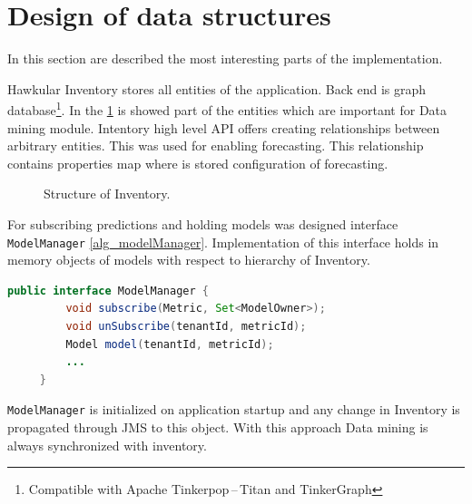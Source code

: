     \section{Design of data structures}
    In this section are described the most interesting parts of the implementation.
    
    Hawkular Inventory stores all entities of the application. Back end is graph
    database\footnote{Compatible with Apache Tinkerpop\,--\,Titan and TinkerGraph}.
    In the \ref{img_inventory} is showed part of the entities which are important for 
    Data mining module.
    Intentory high level API offers creating relationships between arbitrary entities. 
    This was used for enabling forecasting. This relationship contains properties map
    where is stored configuration of forecasting.

    \begin{figure}[H]
        \begin{center}
            \caption{Structure of Inventory.}
            \label{img_inventory}
        \end{center}
    \end{figure}

    For subscribing predictions and holding models was designed interface
    \texttt{ModelManager} \ref{alg_modelManager}. 
    Implementation of this interface holds in memory 
    objects of models with respect to hierarchy of Inventory.

    \begin{lstlisting}[caption={Interface Model Manager}, language=Java, label={alg_modelManager}]
     public interface ModelManager {
         void subscribe(Metric, Set<ModelOwner>);
         void unSubscribe(tenantId, metricId);
         Model model(tenantId, metricId);
         ...
     }
    \end{lstlisting}

    \texttt{ModelManager} is initialized on application startup and any change in
    Inventory is propagated through JMS to this object. With this approach Data mining is
    always synchronized with inventory. 

